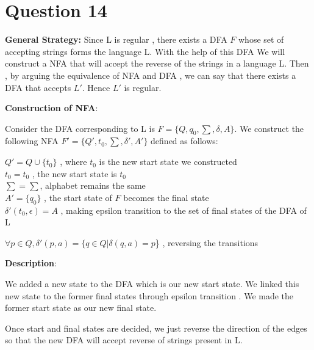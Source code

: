 \documentclass[12pt,a4paper]{article}
\begin{document}
\section{Question 14}

\textbf{General Strategy:}
Since L is regular , there exists a DFA $F$ whose set of accepting strings forms the language L.
With the help of this DFA We will construct a NFA that will accept the reverse of the strings in a language L. Then , by arguing the equivalence of NFA and DFA , we can say that there exists a DFA that accepts $L'$. Hence $L'$ is regular.

\textbf{Construction of NFA}:

Consider the DFA corresponding to L is $F=\{Q,q_0,\sum,\delta,A\}$. We construct the following NFA $F'=\{Q',t_0,\sum,\delta',A'\}$ defined as follows:

\begin{center}
    $Q'=Q \cup \{t_0\}$ , where $t_0$ is the new start state we constructed \\
    $t_0=t_0$ , the new start state is $t_0$ \\
    $\sum = \sum$, alphabet remains the same \\
    $A'=\{q_0\}$ , the start state of $F$ becomes the final state\\
    $\delta'(t_0,\epsilon)=A$ , making epsilon transition to the set of final states of the DFA of L
    
    $\forall p \in Q , \delta'(p,a)=\{q \in Q| \delta(q,a)=p$\} , reversing the transitions
    
    
    
\end{center}

\textbf{Description}:

We added a new state to the DFA which is our new start state. We linked this new state to the former final states through epsilon transition . We made the former start state as our new final state. 

Once start and final states are decided, we just reverse the direction of the edges so that the new DFA will accept reverse of strings present in L.
\end{document}
